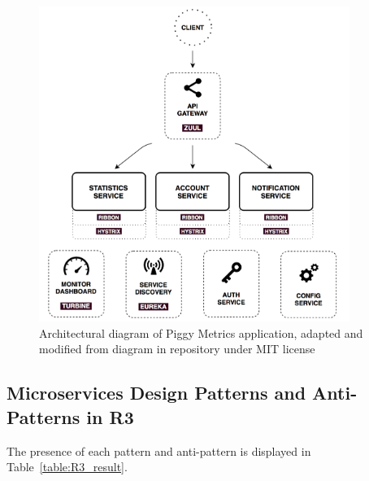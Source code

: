 \documentclass{Configuration_Files/PoliMi3i_thesis}
\begin{document}
\begin{figure}[H]
\centering
\includegraphics[width=0.9\textwidth]{myImages/R3.png}
\caption{Architectural diagram of Piggy Metrics application, adapted and modified from diagram in repository under MIT license}
\label{fig:R3_arch}
\end{figure}

\subsection{Microservices Design Patterns and Anti-Patterns in R3}
\label{subsec:R3_detection}

The presence of each pattern and anti-pattern is displayed in Table~\ref{table:R3_result}.
\end{document}
